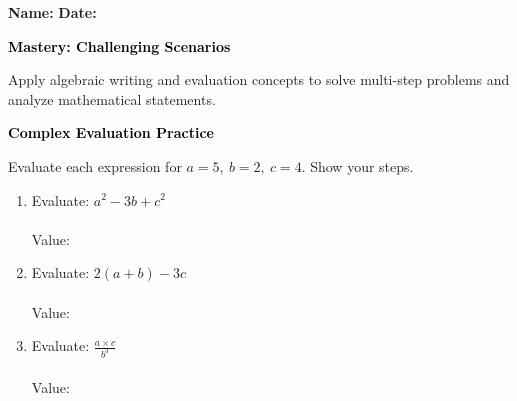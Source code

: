\documentclass[12pt, letterpaper, fleqn]{article}
\newcommand{\blanklong}{\underline{\hspace{6.5cm}}}
\begin{document}
\textbf{Name:} \underline{\hspace{5cm}}
\hfill
\textbf{Date:} \underline{\hspace{3cm}}\\

\begin{tcolorbox}[colback=black!10]
    \large\textcolor{black}{\textbf{Mastery: Challenging Scenarios}}
\end{tcolorbox}

\vspace{3mm}
\noindent
Apply algebraic writing and evaluation concepts to solve multi-step problems and analyze mathematical statements.

\vspace{4mm}

\begin{tcolorbox}[colback=black!10]
\large\textcolor{black}{\textbf{Complex Evaluation Practice}}
\end{tcolorbox}

\noindent
Evaluate each expression for $a = 5, \ b = 2, \ c = 4$. Show your steps.

\vspace{3mm}

\begin{enumerate}[itemsep=1cm, leftmargin=0.6cm]

\item Evaluate: $a^2 - 3b + c^2$ \\ \\
Value: \blanklong

\vspace{1.3cm}

\item Evaluate: $2(a + b) - 3c$ \\ \\
Value: \blanklong

\vspace{1.3cm}

\item Evaluate: $\frac{a \times c}{b^3}$ \\ \\
Value: \blanklong

\vspace{1cm}

\end{enumerate}
\end{document}
